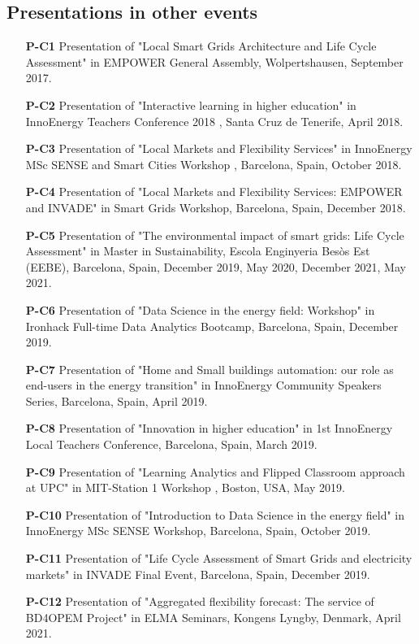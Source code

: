 \subsection*{Presentations in other events}
\begin{itemize}
	\item [\textbf{P-C1}] Presentation of "Local Smart Grids Architecture and Life Cycle Assessment" in EMPOWER General Assembly, Wolpertshausen, September 2017.		
	\item [\textbf{P-C2}] Presentation of "Interactive learning in higher education" in InnoEnergy Teachers Conference 2018 , Santa Cruz de Tenerife, April 2018.	
	\item [\textbf{P-C3}] Presentation of "Local Markets and Flexibility Services" in InnoEnergy MSc SENSE and Smart Cities Workshop , Barcelona, Spain, October 2018.	
	\item [\textbf{P-C4}] Presentation of "Local Markets and Flexibility Services: EMPOWER and INVADE" in Smart Grids Workshop, Barcelona, Spain, December 2018.	
	\item [\textbf{P-C5}] Presentation of "The environmental impact of smart grids: Life Cycle Assessment" in Master in Sustainability, Escola Enginyeria Bes\`{o}s Est (EEBE), Barcelona, Spain, December 2019, May 2020, December 2021, May 2021.
	\item [\textbf{P-C6}] Presentation of "Data Science in the energy field: Workshop" in Ironhack Full-time Data Analytics Bootcamp, Barcelona, Spain, December 2019.
	\item [\textbf{P-C7}] Presentation of "Home and Small buildings automation: our role as end-users in the energy transition" in InnoEnergy Community Speakers Series, Barcelona, Spain, April 2019.
	\item [\textbf{P-C8}] Presentation of "Innovation in higher education" in 1st InnoEnergy Local Teachers Conference, Barcelona, Spain, March 2019.
	\item [\textbf{P-C9}] Presentation of "Learning Analytics and Flipped Classroom approach at UPC" in MIT-Station 1 Workshop , Boston, USA, May 2019.	
	\item [\textbf{P-C10}] Presentation of "Introduction to Data Science in the energy field" in InnoEnergy MSc SENSE Workshop, Barcelona, Spain, October 2019.
	\item [\textbf{P-C11}] Presentation of "Life Cycle Assessment of Smart Grids and electricity markets" in INVADE Final Event, Barcelona, Spain, December 2019.
	\item [\textbf{P-C12}] Presentation of "Aggregated flexibility forecast: The service of BD4OPEM Project" in ELMA Seminars, Kongens Lyngby, Denmark, April 2021.

\end{itemize}
